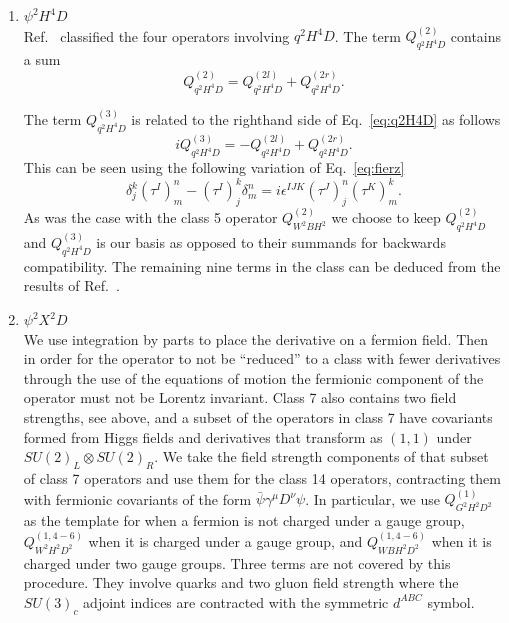 \begin{enumerate}
\item $\psi^2H^4D$ \\
Ref.~\cite{Hays:2018zze} classified the four operators involving $q^2H^4D$.
The term $Q_{q^2H^4D}^{(2)}$ contains a sum
\begin{equation}
\label{eq:q2H4D}
Q_{q^2H^4D}^{(2)} = Q_{q^2H^4D}^{(2l)} + Q_{q^2H^4D}^{(2r)} .
\end{equation}

The term $Q_{q^2H^4D}^{(3)}$ is related to the righthand side of Eq.~\eqref{eq:q2H4D} as follows
\begin{equation}
\label{eq:Q3}
i Q_{q^2H^4D}^{(3)} = - Q_{q^2H^4D}^{(2l)} + Q_{q^2H^4D}^{(2r)} .
\end{equation}
This can be seen using the following variation of Eq.~\eqref{eq:fierz}
\begin{equation}
\label{eq:fierz_ep}
\delta_j^k (\tau^I)_m^n - (\tau^I)_j^k \delta_m^n = i \epsilon^{IJK} (\tau^J)_j^n (\tau^K)_m^k .
\end{equation}
As was the case with the class 5 operator $Q_{W^2BH^2}^{(2)}$ we choose to keep $Q_{q^2H^4D}^{(2)}$ and $Q_{q^2H^4D}^{(3)}$ is our basis as opposed to their summands for backwards compatibility.
The remaining nine terms in the class can be deduced from the results of Ref.~\cite{Hays:2018zze}.

\item $\psi^2X^2D$ \\
We use integration by parts to place the derivative on a fermion field.
Then in order for the operator to not be ``reduced'' to a class with fewer derivatives through the use of the equations of motion the fermionic component of the operator must not be Lorentz invariant.
Class 7 also contains two field strengths, see above, and a subset of the operators in class 7 have covariants formed from Higgs fields and derivatives that transform as $(1, 1)$ under $SU(2)_L \otimes SU(2)_R$.
We take the field strength components of that subset of class 7 operators and use them for the class 14 operators, contracting them with fermionic covariants of the form $\bar \psi \gamma^\mu D^\nu \psi$.
In particular, we use $Q_{G^2H^2D^2}^{(1)}$ as the template for when a fermion is not charged under a gauge group, $Q_{W^2H^2D^2}^{(1, 4-6)}$ when it is charged under a gauge group, and $Q_{WBH^2D^2}^{(1, 4-6)}$ when it is charged under two gauge groups.
Three terms are not covered by this procedure.
They involve quarks and two gluon field strength where the $SU(3)_c$ adjoint indices are contracted with the symmetric $d^{ABC}$ symbol.


\end{enumerate}
